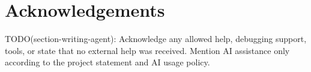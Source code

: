 \documentclass[10pt,twocolumn]{article}
\begin{document}
\section*{Acknowledgements}

TODO(section-writing-agent): Acknowledge any allowed help, debugging support, tools, or state that no external help was received. Mention AI assistance only according to the project statement and AI usage policy.




\end{document}
